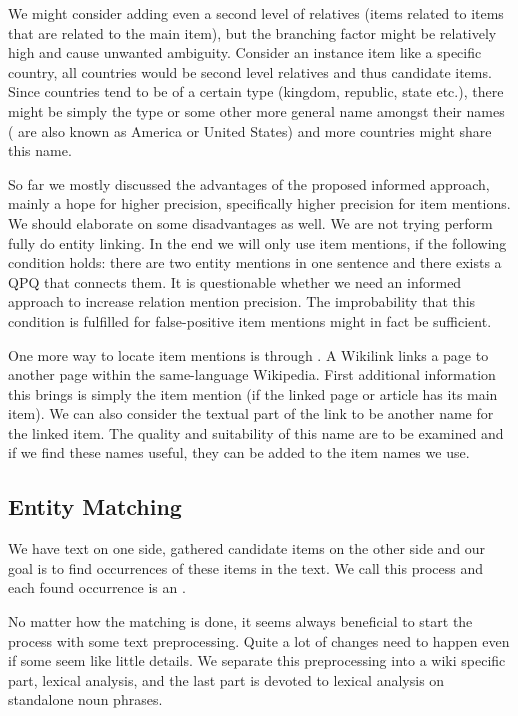 We might consider adding even a second level of relatives (items related to items that are related to the main item), but the branching factor might be relatively high and cause unwanted ambiguity. Consider an instance item like a specific country, all countries would be second level relatives and thus candidate items. Since countries tend to be of a certain type (kingdom, republic, state etc.), there might be simply the type or some other more general name amongst their names ( are also known as America or United States) and more countries might share this name.

So far we mostly discussed the advantages of the proposed informed approach, mainly a hope for higher precision, specifically higher precision for item mentions. We should elaborate on some disadvantages as well. We are not trying perform fully do entity linking. In the end we will only use item mentions, if the following condition holds: there are two entity mentions in one sentence and there exists a QPQ that connects them. It is questionable whether we need an informed approach to increase relation mention precision. The improbability that this condition is fulfilled for false-positive item mentions might in fact be sufficient.

One more way to locate item mentions is through . A Wikilink links a page to another page within the same-language Wikipedia. First additional information this brings is simply the item mention (if the linked page or article has its main item). We can also consider the textual part of the link to be another name for the linked item. The quality and suitability of this name are to be examined and if we find these names useful, they can be added to the item names we use.


\subsection{Entity Matching}

We have text on one side, gathered candidate items on the other side and our goal is to find occurrences of these items in the text. We call this process  and each found occurrence is an .

No matter how the matching is done, it seems always beneficial to start the process with some text preprocessing. Quite a lot of changes need to happen even if some seem like little details. We separate this preprocessing into a wiki specific part, lexical analysis, and the last part is devoted to lexical analysis on standalone noun phrases.

